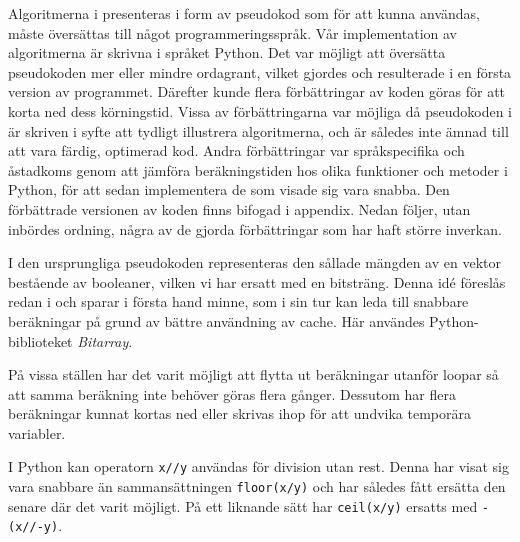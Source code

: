 
Algoritmerna i \cite{HaraldSieve} presenteras i form av pseudokod som för att kunna användas, måste översättas till något programmeringsspråk.
Vår implementation av algoritmerna är skrivna i språket Python.
Det var möjligt att översätta pseudokoden mer eller mindre ordagrant, vilket gjordes och resulterade i en första version av programmet.
Därefter kunde flera förbättringar av koden göras för att korta ned dess körningstid. 
Vissa av förbättringarna var möjliga då pseudokoden i \cite{HaraldSieve} är skriven i syfte att tydligt illustrera algoritmerna,
och är således inte ämnad till att vara färdig, optimerad kod.
Andra förbättringar var språkspecifika och åstadkoms genom att jämföra beräkningstiden hos olika funktioner och metoder i Python, för att sedan implementera de som visade sig vara snabba.
Den förbättrade versionen av koden finns bifogad i appendix.
Nedan följer, utan inbördes ordning, några av de gjorda förbättringar som har haft större inverkan.
\begin{myitemize}
    \item
    I den ursprungliga pseudokoden representeras den sållade mängden av en vektor bestående av booleaner, vilken vi har ersatt med en bitsträng.
    Denna idé föreslås redan i \cite{HaraldSieve} och sparar i första hand minne,
    som i sin tur kan leda till snabbare beräkningar på grund av bättre användning av cache.
    Här användes Python-biblioteket \textit{Bitarray}.
    \item
    På vissa ställen har det varit möjligt att flytta ut beräkningar utanför loopar så att samma beräkning inte behöver göras flera gånger. 
    Dessutom har flera beräkningar kunnat kortas ned eller skrivas ihop för att undvika temporära variabler.
    \item
    I Python kan operatorn \texttt{x//y} användas för division utan rest. Denna har visat sig vara snabbare än sammansättningen \texttt{floor(x/y)} och har således fått ersätta den senare där det varit möjligt. På ett liknande sätt har \texttt{ceil(x/y)} ersatts med \texttt{-(x//-y)}.
\end{myitemize}
